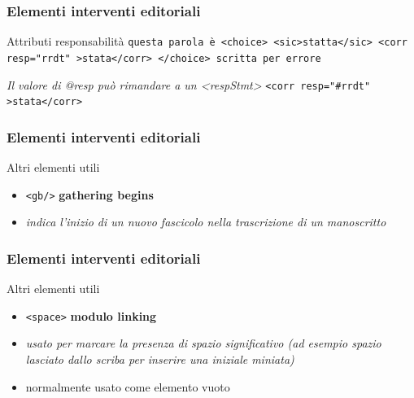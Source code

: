 
\begin{frame}
    \frametitle{Elementi interventi editoriali}
    \addtocounter{nframe}{1}
    

    \begin{block}{Attributi responsabilità}
        \texttt{questa parola è <choice> <sic>statta</sic> <corr resp="rrdt" >stata</corr> </choice> scritta per errore}
    \end{block}
    \textit{Il valore di @resp può rimandare a un <respStmt>}
    \texttt{<corr resp="\#rrdt" >stata</corr>}
\end{frame}



\begin{frame}
    \frametitle{Elementi interventi editoriali}
    \addtocounter{nframe}{1}
    
    \begin{block}{Altri elementi utili}
        \begin{itemize}
            \item \texttt{<gb/>} \textbf{gathering begins}
            \item[] \textit{indica l’inizio di un nuovo fascicolo nella trascrizione di un manoscritto}
        \end{itemize}
        
    \end{block}
    
\end{frame}

\begin{frame}
    \frametitle{Elementi interventi editoriali}
    \addtocounter{nframe}{1}
    
    \begin{block}{Altri elementi utili}
        \begin{itemize}
            \item \texttt{<space>} \textbf{modulo linking}
            \item[] \textit{usato per marcare la presenza di spazio significativo (ad esempio spazio lasciato dallo scriba per inserire una iniziale miniata)}
            \item[] normalmente usato come elemento vuoto
        \end{itemize}
        
    \end{block}
    
\end{frame}

